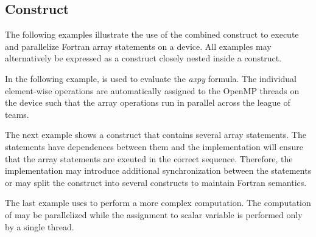 \begin{fortranspecific}[4ex]
\section{ Construct}
\label{sec:target_teams_workdistribute}

The following examples illustrate the use of the combined  construct to execute and parallelize Fortran array statements on
a device.  All examples may alternatively be expressed as a 
construct closely nested inside a  construct.


In the following example,  is used to
evaluate the \emph{axpy} formula. The individual element-wise operations are
automatically assigned to the OpenMP threads on the device such that the
array operations run in parallel across the league of teams.


The next example shows a  construct that
contains several array statements. The statements have dependences between
them and the implementation will ensure that the array statements are exeuted
in the correct sequence. Therefore, the implementation may introduce additional
synchronization between the statements or may split the construct into several
 constructs to maintain Fortran semantics.


The last example uses  to perform a more
complex computation. The computation of  may be
parallelized while the assignment to scalar variable  is performed only by a
single thread.


\end{fortranspecific}
